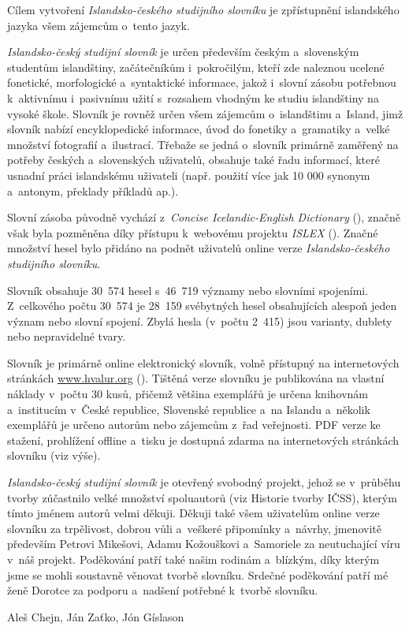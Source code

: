 Cílem vytvoření\textit{ Islandsko-českého studijního slovníku} je zpřístupnění islandského jazyka všem zájemcům o~tento jazyk. 

\textit{Islandsko-český studijní slovník} je určen především českým a~slovenským studentům islandštiny, začátečníkům i~pokročilým, kteří zde naleznou ucelené fonetické, morfologické a~syntaktické informace, jakož
i~slovní zásobu potřebnou k~aktivnímu i~pasivnímu užití s~rozsahem vhodným ke studiu islandštiny na vysoké škole.
Slovník je rovněž určen všem zájemcům o~islandštinu a~Island, jimž slovník nabízí encyklopedické informace, úvod do fonetiky a~gramatiky a~velké množství fotografií a~ilustrací. 
Třebaže se jedná o~slovník primárně zaměřený na potřeby českých a~slovenských uživatelů, obsahuje také řadu informací, které usnadní práci islandskému uživateli (např. použití více jak 10 000 synonym a~antonym, překlady příkladů ap.).

Slovní zásoba původně vychází z~\textit{Concise Icelandic-English Dictionary} (\cite {ic_en}), značně však byla pozměněna díky přístupu k~webovému projektu \textit{ISLEX} (\cite {int1}). Značné množství hesel bylo
přidáno na podnět uživatelů online verze \textit{Islandsko-českého studijního slovníku}.

Slovník obsahuje 30~574 hesel s~46~719 významy nebo slovními spojeními. Z~celkového počtu 30~574 je 28~159 svébytných hesel obsahujících alespoň jeden význam nebo slovní spojení. 
Zbylá hesla (v~počtu 2~415) jsou varianty, dublety nebo nepravidelné tvary.

Slovník je primárně online elektronický slovník, volně přístupný na internetových stránkách \url{www.hvalur.org}  (\cite {int14}). 
Tištěná verze slovníku je publikována na vlastní náklady v~počtu 30 kusů, přičemž většina exemplářů je určena knihovnám a~institucím v~České republice, Slovenské republice a~na Islandu
a~několik exemplářů je určeno autorům nebo zájemcům z~řad veřejnosti. PDF verze ke stažení, prohlížení offline a~tisku je dostupná zdarma na internetových stránkách slovníku (viz výše).


\textit{Islandsko-český studijní slovník} je otevřený svobodný projekt, jehož se v~průběhu tvorby zúčastnilo velké množství spoluautorů (viz Historie tvorby IČSS), kterým tímto jménem autorů velmi děkuji.
Děkuji také všem uživatelům online verze slovníku za trpělivost, dobrou vůli a~veškeré připomínky a~návrhy, jmenovitě především Petrovi Mikešovi, Adamu Kožouškovi a~Samoriele za neutuchající víru v~náš projekt.
Poděkování patří také našim rodinám a~blízkým, díky kterým jsme se mohli soustavně věnovat tvorbě slovníku.
Srdečné poděkování patří mé ženě Dorotce za podporu a~nadšení potřebné k~tvorbě slovníku.


\blspace[5]

{\centering Aleš Chejn, Ján Zaťko, Jón Gíslason\par}
